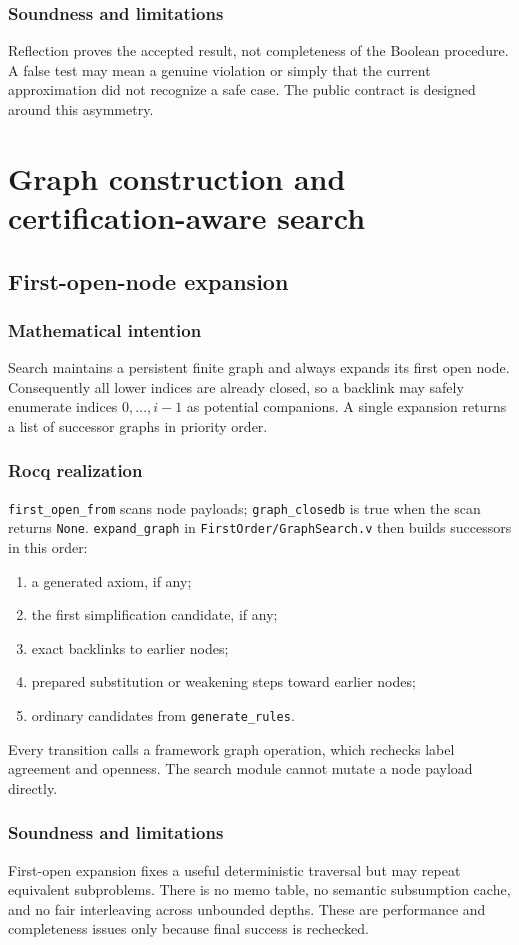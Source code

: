 \documentclass[11pt,oneside]{book}
\DeclareRobustCommand{\code}[1]{\nolinkurl{#1}}
\DeclareRobustCommand{\file}[1]{\nolinkurl{#1}}
\newcommand{\src}[2]{\code{#2} in \file{#1}}
\newcommand{\mathintent}{\subsection*{Mathematical intention}}
\newcommand{\rocqreal}{\subsection*{Rocq realization}}
\newcommand{\soundlim}{\subsection*{Soundness and limitations}}
\begin{document}
\soundlim

Reflection proves the accepted result, not completeness of the Boolean
procedure.  A false test may mean a genuine violation or simply that the
current approximation did not recognize a safe case.  The public contract is
designed around this asymmetry.

\chapter{Graph construction and certification-aware search}
\label{ch:graph-search}

\section{First-open-node expansion}

\mathintent

Search maintains a persistent finite graph and always expands its first open
node.  Consequently all lower indices are already closed, so a backlink may
safely enumerate indices \(0,\ldots,i-1\) as potential companions.  A single
expansion returns a list of successor graphs in priority order.

\rocqreal

\code{first_open_from} scans node payloads; \code{graph_closedb} is true when
the scan returns \code{None}.  \src{FirstOrder/GraphSearch.v}{expand_graph}
then builds successors in this order:
\begin{enumerate}[leftmargin=*]
\item a generated axiom, if any;
\item the first simplification candidate, if any;
\item exact backlinks to earlier nodes;
\item prepared substitution or weakening steps toward earlier nodes;
\item ordinary candidates from \code{generate_rules}.
\end{enumerate}
Every transition calls a framework graph operation, which rechecks label
agreement and openness.  The search module cannot mutate a node payload
directly.

\soundlim

First-open expansion fixes a useful deterministic traversal but may repeat
equivalent subproblems.  There is no memo table, no semantic subsumption cache,
and no fair interleaving across unbounded depths.  These are performance and
completeness issues only because final success is rechecked.
\end{document}
